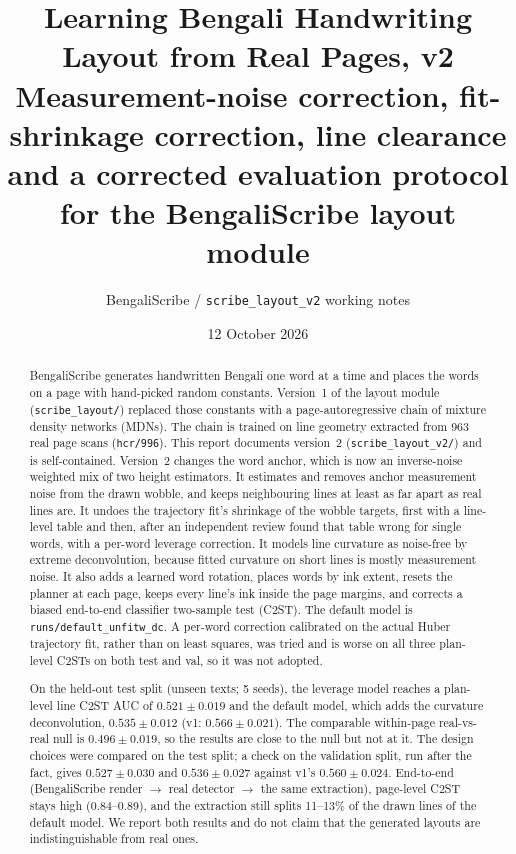 \documentclass[11pt,a4paper]{article}
\title{Learning Bengali Handwriting Layout from Real Pages, v2\\[2pt]
\large Measurement-noise correction, fit-shrinkage correction, line clearance\\
and a corrected evaluation protocol for the BengaliScribe layout module}
\author{BengaliScribe / \texttt{scribe\_layout\_v2} working notes}
\date{12 October 2026}
\begin{document}
\maketitle

\begin{abstract}
BengaliScribe generates handwritten Bengali one word at a time and places the
words on a page with hand-picked random constants. Version~1 of the layout
module (\texttt{scribe\_layout/}) replaced those constants with a
page-autoregressive chain of mixture density networks (MDNs). The chain is
trained on line geometry extracted from 963 real page scans (\texttt{hcr/996}).
This report documents version~2 (\texttt{scribe\_layout\_v2/}) and is
self-contained. Version~2 changes the word anchor, which is now an inverse-noise
weighted mix of two height estimators. It estimates and removes anchor
measurement noise from the drawn wobble, and keeps neighbouring lines at least
as far apart as real lines are. It undoes the trajectory fit's shrinkage of the
wobble targets, first with a line-level table and then, after an independent
review found that table wrong for single words, with a per-word leverage
correction. It models line curvature as noise-free by extreme deconvolution,
because fitted curvature on short lines is mostly measurement noise. It also
adds a learned word rotation, places words by ink extent, resets the planner
at each page, keeps every line's ink inside the page margins, and corrects a
biased end-to-end classifier two-sample test (C2ST). The default model is
\texttt{runs/default\_unfitw\_dc}. A per-word correction calibrated on the
actual Huber trajectory fit, rather than on least squares, was tried and is
worse on all three plan-level C2STs on both test and val, so it was not
adopted.

On the held-out test split (unseen texts; 5 seeds), the leverage model reaches
a plan-level line C2ST AUC of $0.521\pm0.019$ and the default model, which adds
the curvature deconvolution, $0.535\pm0.012$ (v1: $0.566\pm0.021$). The
comparable within-page real-vs-real null is $0.496\pm0.019$, so the results
are close to the null but not at it. The design choices were compared on the
test split; a check on the validation split, run after the fact, gives
$0.527\pm0.030$ and $0.536\pm0.027$ against v1's $0.560\pm0.024$. End-to-end
(BengaliScribe render $\rightarrow$ real detector $\rightarrow$ the same
extraction), page-level C2ST stays high (0.84--0.89), and the extraction still
splits 11--13\% of the drawn lines of the default model. We report both results
and do not claim that the generated layouts are indistinguishable from real
ones.
\end{abstract}
\end{document}
